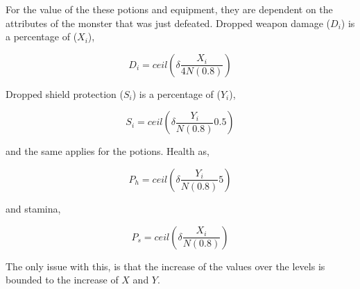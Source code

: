 
For the value of the these potions and equipment, they are dependent on the attributes of the monster that was just defeated. Dropped weapon damage ($D_i$) is a percentage of ($X_i$),

\begin{equation}
    D_i = ceil\left (\delta \frac{X_i}{4N(0.8)} \right)
\end{equation}

\noindent Dropped shield protection ($S_i$) is a percentage of ($Y_i$),

\begin{equation}
    S_i = ceil \left( \delta \frac{Y_i}{N(0.8)}0.5 \right)
\end{equation}

and the same applies for the potions. Health as,

\begin{equation}
    P_h = ceil \left( \delta \frac{Y_i}{N(0.8)}5 \right)
\end{equation}

and stamina,

\begin{equation}
    P_s = ceil \left( \delta \frac{X_i}{N(0.8)} \right)
\end{equation}

\noindent The only issue with this, is that the increase of the values over the levels is bounded to the increase of $X$ and $Y$.